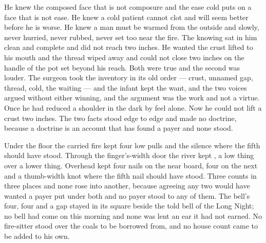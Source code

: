 He knew the composed face that is not composure and the ease cold puts on a face that is not ease. He knew a cold patient cannot clot and will seem better before he is worse. He knew a man must be warmed from the outside and slowly, never hurried, never rubbed, never set too near the fire. The knowing sat in him clean and complete and did not reach two inches. He wanted the crust lifted to his mouth and the thread wiped away and could not close two inches on the handle of the pot set beyond his reach. Both were true and the second was louder. The surgeon took the inventory in its old order --- crust, unnamed gap, thread, cold, the waiting --- and the infant kept the want, and the two voices argued without either winning, and the argument was the work and not a virtue. Once he had reduced a shoulder in the dark by feel alone. Now he could not lift a crust two inches. The two facts stood edge to edge and made no doctrine, because a doctrine is an account that has found a payer and none stood.

Under the floor the carried fire kept four low pulls and the silence where the fifth should have stood. Through the finger's-width door the river kept , a low thing over a lower thing. Overhead  kept four nails on the near board, four on the next and a thumb-width knot where the fifth nail should have stood. Three counts in three places and none rose into another, because agreeing any two would have wanted a payer put under both and no payer stood to any of them. The bell's four, four and a gap stayed in its square beside the told bell of the Long Night; no bell had come on this morning and none was lent an ear it had not earned. No fire-sitter stood over the coals to be borrowed from, and no house count came to be added to his own.

